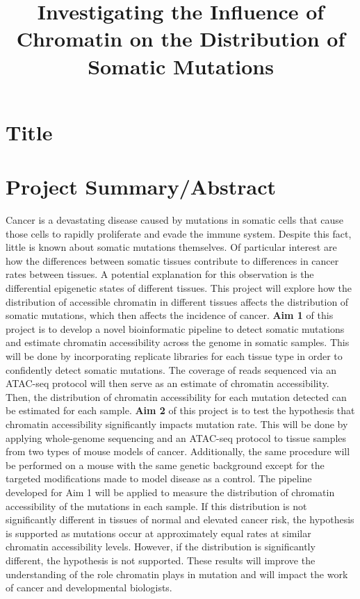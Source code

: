 \documentclass[12pt]{article}
\title{Investigating the Influence of Chromatin on the Distribution of Somatic Mutations}
\date{}
\begin{document}
\section{Title}
\maketitle

\section{Project Summary/Abstract} %

Cancer is a devastating disease caused by mutations in somatic cells that cause those cells to rapidly proliferate and evade the immune system.
Despite this fact, little is known about somatic mutations themselves.
Of particular interest are how the differences between somatic tissues contribute to differences in cancer rates between tissues.
A potential explanation for this observation is the differential epigenetic states of different tissues.
This project will explore how the distribution of accessible chromatin in different tissues affects the distribution of somatic mutations, which then affects the incidence of cancer.
\textbf{Aim 1} of this project is to develop a novel bioinformatic pipeline to detect somatic mutations and estimate chromatin accessibility across the genome in somatic samples.
This will be done by incorporating replicate libraries for each tissue type in order to confidently detect somatic mutations.
The coverage of reads sequenced via an ATAC-seq protocol will then serve as an estimate of chromatin accessibility.
Then, the distribution of chromatin accessibility for each mutation detected can be estimated for each sample.
\textbf{Aim 2} of this project is to test the hypothesis that chromatin accessibility significantly impacts mutation rate.
This will be done by applying whole-genome sequencing and an ATAC-seq protocol to tissue samples from two types of mouse models of cancer.
Additionally, the same procedure will be performed on a mouse with the same genetic background except for the targeted modifications made to model disease as a control.
The pipeline developed for Aim 1 will be applied to measure the distribution of chromatin accessibility of the mutations in each sample.
If this distribution is not significantly different in tissues of normal and elevated cancer risk, the hypothesis is supported as mutations occur at approximately equal rates at similar chromatin accessibility levels.
However, if the distribution is significantly different, the hypothesis is not supported.
These results will improve the understanding of the role chromatin plays in mutation and will impact the work of cancer and developmental biologists.
\end{document}

